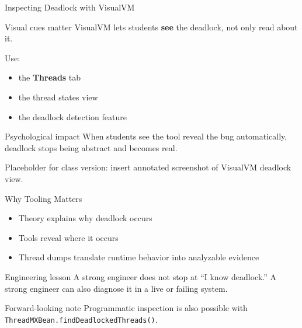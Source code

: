 \documentclass[aspectratio=169,11pt]{beamer}
\begin{document}
	\begin{frame}{Inspecting Deadlock with VisualVM}
		\begin{block}{Visual cues matter}
			VisualVM lets students \textbf{see} the deadlock, not only read about it.
		\end{block}
		
		\bigskip
		
		Use:
		\begin{itemize}
			\item the \textbf{Threads} tab
			\item the thread states view
			\item the deadlock detection feature
		\end{itemize}
		
		\bigskip
		
		\begin{alertblock}{Psychological impact}
			When students see the tool reveal the bug automatically,
			deadlock stops being abstract and becomes real.
		\end{alertblock}
		
		\vspace{0.2cm}
		{\scriptsize Placeholder for class version: insert annotated screenshot of VisualVM deadlock view.}
	\end{frame}
	
	\begin{frame}{Why Tooling Matters}
		\begin{itemize}
			\item Theory explains why deadlock occurs
			\item Tools reveal where it occurs
			\item Thread dumps translate runtime behavior into analyzable evidence
		\end{itemize}
		
		\bigskip
		
		\begin{block}{Engineering lesson}
			A strong engineer does not stop at “I know deadlock.”  
			A strong engineer can also diagnose it in a live or failing system.
		\end{block}
		
		\bigskip
		
		\begin{alertblock}{Forward-looking note}
			Programmatic inspection is also possible with \texttt{ThreadMXBean.findDeadlockedThreads()}.
		\end{alertblock}
	\end{frame}
	
\end{document}
